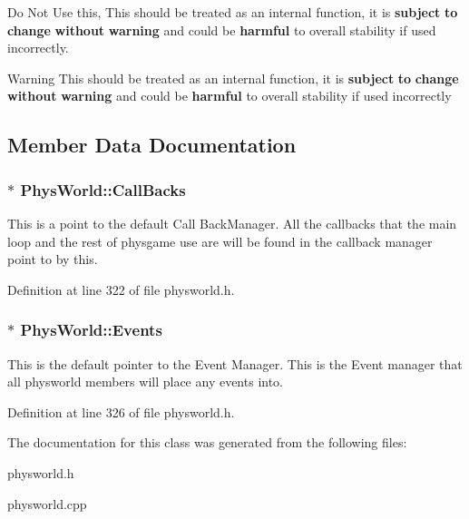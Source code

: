 Do Not Use this, This should be treated as an internal function, it is {\bfseries subject} {\bfseries to} {\bfseries change} {\bfseries without} {\bfseries warning} and could be {\bfseries harmful} to overall stability if used incorrectly. \begin{DoxyWarning}{Warning}
This should be treated as an internal function, it is {\bfseries subject} {\bfseries to} {\bfseries change} {\bfseries without} {\bfseries warning} and could be {\bfseries harmful} to overall stability if used incorrectly 
\end{DoxyWarning}


\subsection{Member Data Documentation}
\hypertarget{classPhysWorld_a080ea6f1584374b07d3c1f29c7ed64df}{
\subsubsection[{CallBacks}]{$\ast$ {\bf PhysWorld::CallBacks}}}
\label{db/df5/classPhysWorld_a080ea6f1584374b07d3c1f29c7ed64df}


This is a point to the default Call BackManager. All the callbacks that the main loop and the rest of physgame use are will be found in the callback manager point to by this. 

Definition at line 322 of file physworld.h.\hypertarget{classPhysWorld_a601b3c6093aaf2a69fcd3311dde9aadc}{
\subsubsection[{Events}]{$\ast$ {\bf PhysWorld::Events}}}
\label{db/df5/classPhysWorld_a601b3c6093aaf2a69fcd3311dde9aadc}


This is the default pointer to the Event Manager. This is the Event manager that all physworld members will place any events into. 

Definition at line 326 of file physworld.h.

The documentation for this class was generated from the following files:\begin{DoxyCompactItemize}
\item 
physworld.h\item 
physworld.cpp\end{DoxyCompactItemize}

